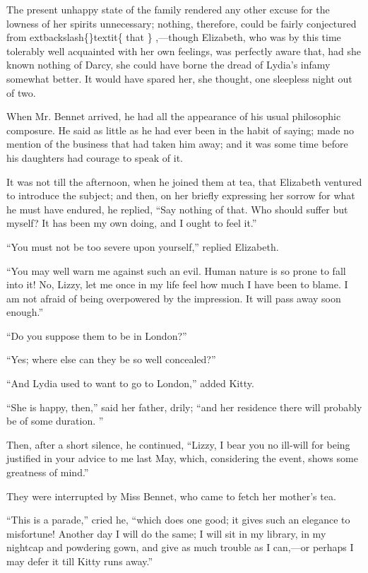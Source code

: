 \documentclass[10pt]{book}
\begin{document}
   The present unhappy state of the family rendered any
   other excuse for
the lowness of her spirits unnecessary; nothing, therefore, could be
fairly conjectured from
   	extbackslash\{\}textit\{
    that
   \}
   ,—though Elizabeth, who was by this time
tolerably well acquainted with her own feelings, was perfectly aware
that, had she known nothing of Darcy, she could have borne the dread of
Lydia’s infamy somewhat better. It would have spared her, she thought,
one sleepless night out of two.
  

   When Mr. Bennet arrived, he had all the appearance of his usual
philosophic composure. He said as little as he had ever been in the
habit of saying; made no mention of the business that had taken him
away; and it was some time before his daughters had courage to speak of
it.
  

   It was not till the afternoon, when he joined them at tea, that
Elizabeth ventured to introduce the subject; and then, on her briefly
expressing her sorrow for what he must have endured, he replied, “Say
nothing of that. Who should suffer but myself? It has been my own doing,
and I ought to feel it.”
  

   “You must not be too severe upon yourself,” replied Elizabeth.
  

   “You may well warn me against such an evil. Human nature is so prone to
fall into it! No, Lizzy, let me once in my life feel how much I have
been to blame. I am not afraid of being overpowered by the impression.
It will pass away soon enough.”
  

   “Do you suppose them to be in London?”
  

   “Yes; where else can they be so well concealed?”
  

   “And Lydia used to want to go to London,” added Kitty.
  

   “She is happy, then,” said her father, drily; “and her residence there
will probably be of some duration.
   ”
  

   Then, after a short silence, he continued, “Lizzy, I bear you no
ill-will for being justified in your advice to me last May, which,
considering the event, shows some greatness of mind.”
  

   They were interrupted by Miss Bennet, who came to fetch her mother’s
tea.
  

   “This is a parade,” cried he, “which does one good; it gives such an
elegance to misfortune! Another day I will do the same; I will sit in my
library, in my nightcap and powdering gown, and give as much trouble as
I can,—or perhaps I may defer it till Kitty runs away.”
  
\end{document}
